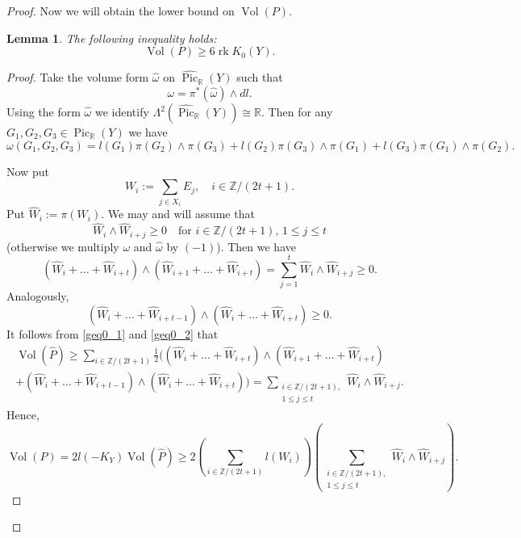\documentclass[11pt,leqno]{amsart}
\newtheorem{lemma}[theo]{Lemma}
\numberwithin{equation}{section}
\def\R{\mathbb{R}}
\def\Z{\mathbb{Z}}
\newcommand{\Vol}{\operatorname{Vol}}
\newcommand{\Pic}{\operatorname{Pic}}
\newcommand{\rk}{\operatorname{rk}}
\begin{document}
\begin{proof}
Now we will obtain the lower bound on $\Vol(P).$

\begin{lemma}\label{Vol/rk_K_0}The following inequality holds:
$$\Vol(P)\geq 6\rk K_0(Y).$$\end{lemma}

\begin{proof}Take the volume form $\widehat{\omega}$ on $\widehat{\Pic}_{\R}(Y)$ such that
$$\omega=\pi^*(\widehat{\omega})\wedge dl.$$
Using the form $\widehat{\omega}$ we identify $\Lambda^2(\widehat{\Pic}_{\R}(Y))\cong\R.$
Then for any $G_1,G_2,G_3\in \Pic_{\R}(Y)$ we have
\begin{equation}\omega(G_1,G_2,G_3)=l(G_1)\pi(G_2)\wedge\pi(G_3)+l(G_2)\pi(G_3)\wedge\pi(G_1)+l(G_3)\pi(G_1)\wedge\pi(G_2).\end{equation}

Now put
\begin{equation}W_i:=\sum\limits_{j\in X_i} E_j,\quad i\in\Z/(2t+1).\end{equation}
Put $\widehat{W}_i:=\pi(W_i).$ We may and will assume  that
$$\widehat{W}_i\wedge \widehat{W}_{i+j}\geq 0\quad\text{for }i\in\Z/(2t+1),\, 1\leq j\leq t$$
(otherwise we multiply $\omega$ and $\widehat{\omega}$ by $(-1)$). Then we have
\begin{equation}\label{geq0_1}(\widehat{W}_i+\dots+\widehat{W}_{i+t})\wedge (\widehat{W}_{i+1}+\dots+\widehat{W}_{i+t})=\sum\limits_{j=1}^t \widehat{W}_i\wedge \widehat{W}_{i+j}\geq 0.\end{equation}
Analogously,
\begin{equation}\label{geq0_2}(\widehat{W}_i+\dots+\widehat{W}_{i+t-1})\wedge (\widehat{W}_i+\dots+\widehat{W}_{i+t})\geq 0.\end{equation}
It follows from \eqref{geq0_1} and \eqref{geq0_2} that
\begin{multline}\Vol(\widehat{P})\geq \sum\limits_{i\in\Z/(2t+1)}\frac12((\widehat{W}_i+\dots+\widehat{W}_{i+t})\wedge (\widehat{W}_{i+1}+\dots+\widehat{W}_{i+t})\\+
(\widehat{W}_i+\dots+\widehat{W}_{i+t-1})\wedge (\widehat{W}_i+\dots+\widehat{W}_{i+t}))=\sum_{\substack{i\in\Z/(2t+1),\\
1\leq j\leq t}}\widehat{W}_i\wedge\widehat{W}_{i+j}.\end{multline}
Hence,
\begin{equation}\label{Vol(P)}\Vol(P)=2l(-K_Y)\Vol(\widehat{P})\geq 2(\sum\limits_{i\in\Z/(2t+1)}l(W_i))(\sum_{\substack{i\in\Z/(2t+1),\\
1\leq j\leq t}}\widehat{W}_i\wedge\widehat{W}_{i+j}).\end{equation}


\end{proof}
\end{proof}
\end{document}
